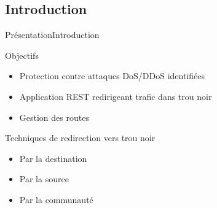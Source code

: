 \subsection{Introduction}

\begin{frame}{Présentation}{Introduction}

\begin{block}{Objectifs}
    \begin{itemize}
        \item Protection contre attaques DoS/DDoS identifiées
        \item Application REST redirigeant trafic dans trou noir
        \item Gestion des routes
    \end{itemize}
\end{block}

\begin{exampleblock}{Techniques de redirection vers trou noir}
    \begin{itemize}
        \item Par la destination
        \item Par la source
        \item Par la communauté
    \end{itemize}
\end{exampleblock}

\end{frame}

